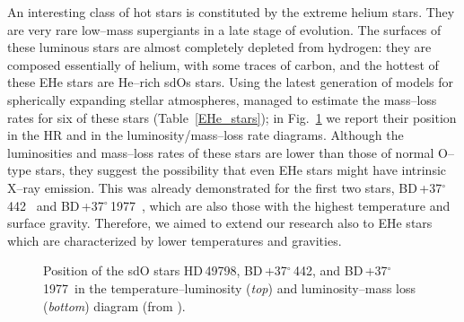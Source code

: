 \documentclass[USenglish,twocolumn]{article}
\def\BDone{BD\,+37$^\circ$\,442}
\def\BDtwo{BD\,+37$^\circ$\,1977}
\def\HDone{HD\,49798}
\begin{document}
An interesting class of hot stars is constituted by the extreme helium stars. They are very rare low--mass supergiants in a late stage of evolution. The surfaces of these luminous stars are almost completely depleted from hydrogen: they are composed essentially of helium, with some traces of carbon, and the hottest of these EHe stars are He--rich sdOs stars. Using the latest generation of models for spherically expanding stellar atmospheres, \citet{JefferyHamann10} managed to estimate the mass--loss rates for six of these stars (Table~\ref{EHe_stars}); in Fig.~\ref{TLMdot} we report their position in the HR and in the luminosity/mass--loss rate diagrams. Although the luminosities and mass--loss rates of these stars are lower than those of normal O--type stars, they suggest the possibility that even EHe stars might have intrinsic X--ray emission. This was already demonstrated for the first two stars, \BDone\ \citep{LaPalombara+12,Mereghetti+17} and \BDtwo\ \citep{LaPalombara+15}, which are also those with the highest temperature and surface gravity. Therefore, we aimed to extend our research also to EHe stars which are characterized by lower temperatures and gravities.

\begin{figure}[]
\centering
{}
\caption{\footnotesize{Position of the sdO stars \HDone, \BDone, and \BDtwo\ in the temperature--luminosity (\textit{top}) and luminosity--mass loss (\textit{bottom}) diagram (from \citet{Hamann10}).}}
\label{TLMdot}
\end{figure}
\end{document}
